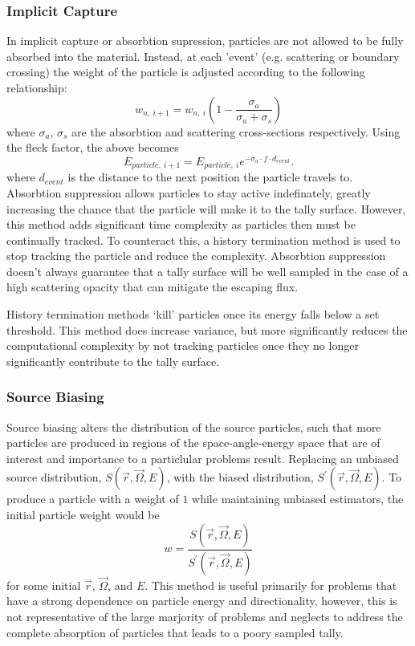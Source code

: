 \documentclass[]{article}
\begin{document}
		\subsubsection{Implicit Capture}
			In implicit capture or absorbtion supression, particles are not allowed to be fully absorbed into the material. Instead, at each 'event' (e.g. scattering or boundary crossing) the weight of the particle is adjusted according to the following relationship:
			\begin{equation}
				w_{n,~i+1} = w_{n,~i} (1 - \frac{\sigma_{a}}{\sigma_{a} + \sigma_{s}})
			\end{equation}
			where $\sigma_{a}$, $\sigma_{s}$ are the absorbtion and scattering cross-sections respectively. Using the fleck factor, the above becomes
			\begin{equation} \label{Eq: new_E}
				E_{particle,~i+1} = E_{particle,~i} e^{-\sigma_{a} \cdot f \cdot d_{event}} .
			\end{equation}
			where $d_{event}$ is the distance to the next position the particle travels to. Absorbtion suppression allows particles to stay active indefinately, greatly increasing the chance that the particle will make it to the tally surface. However, this method adds significant time complexity as particles then must be continually tracked. To counteract this, a history termination method is used to stop tracking the particle and reduce the complexity. Absorbtion suppression doesn't always guarantee that a tally surface will be well sampled in the case of a high scattering opacity that can mitigate the escaping flux.
			
			History termination methods `kill' particles once its energy falls below a set threshold. This method does increase variance, but more significantly reduces the computational complexity by not tracking particles once they no longer significantly contribute to the tally surface.
		
		\subsubsection{Source Biasing}
			Source biasing alters the distribution of the source particles, such that more particles are produced in regions of the space-angle-energy space that are of interest and importance to a particlular problems result. Replacing an unbiased source distribution, $S(\vec{r}, \vec{\Omega}, E)$, with the biased distribution, $S^{\prime}(\vec{r}, \vec{\Omega}, E)$. To produce a particle with a weight of $1$ while maintaining unbiased estimators, the initial particle weight would be 
			\begin{equation}
				w = \frac{S(\vec{r}, \vec{\Omega}, E)}{S^{\prime}(\vec{r}, \vec{\Omega}, E)}
			\end{equation} 
			for some initial $\vec{r}$, $\vec{\Omega}$, and $E$. This method is useful primarily for problems that have a strong dependence on particle energy and directionality, however, this is not representative of the large marjority of problems and neglects to address the complete absorption of particles that leads to a poory sampled tally.
		
\end{document}
